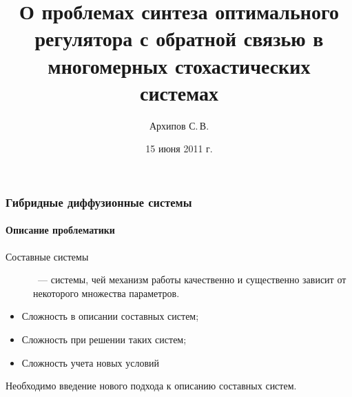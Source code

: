 \documentclass[ignorenonframetext,hyperref={pdftex,unicode},compress]{beamer}
\title{О проблемах синтеза оптимального регулятора с обратной связью в многомерных стохастических системах}
\author{Архипов С.\,В.}
\institute{Научный руководитель: Пакшин П.\,В.}
\date{15 июня 2011 г.}
\begin{document}
\newcommand{\bfig}{ \begin{figure}\center }

\newcommand{\efig}{ \end{figure} }

\newcommand{\addfigure}[3]{ \bfig  \caption{#3} \lbl{#1} \efig }



\begin{frame}
    \titlepage
\end{frame}



\begin{frame}
    \frametitle{Гибридные диффузионные системы}
    \framesubtitle{Описание проблематики}

    \begin{description}
        \item[Составные системы]~--- системы, чей механизм работы качественно и существенно зависит от некоторого множества параметров.
    \end{description}
    \begin{itemize}
        \item Сложность в описании составных систем;
        \item Сложность при решении таких систем;
        \item Сложность учета новых условий
    \end{itemize}
    \par Необходимо введение нового подхода к описанию составных систем.
\end{frame}
\end{document}
